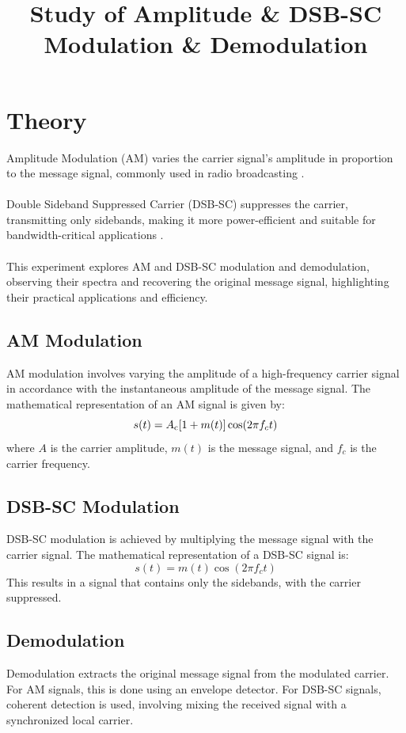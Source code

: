 \documentclass[12pt]{article}
\title{Study of Amplitude \& DSB-SC Modulation \& Demodulation}
\author{}
\date{}
\begin{document}


\pagebreak

\tableofcontents

\pagebreak
{}
\maketitle

\section*{Theory}
Amplitude Modulation (AM) varies the carrier signal's amplitude in proportion to the message signal, commonly used in radio broadcasting \cite{haykin2008communication}.
\\\\
Double Sideband Suppressed Carrier (DSB-SC) suppresses the carrier, transmitting only sidebands, making it more power-efficient and suitable for bandwidth-critical applications \cite{proakis2007digital}.
\\\\
This experiment explores AM and DSB-SC modulation and demodulation, observing their spectra and recovering the original message signal, highlighting their practical applications and efficiency.

\subsection*{AM Modulation}
AM modulation involves varying the amplitude of a high-frequency carrier signal in accordance with the instantaneous amplitude of the message signal. The mathematical representation of an AM signal is given by:
\[
    s(t) = A\textsubscript{c}[1 + m(t)] \cos(2 \pi f_c t)
\]
where \(A\) is the carrier amplitude, \(m(t)\) is the message signal, and \(f_c\) is the carrier frequency.

\subsection*{DSB-SC Modulation}
DSB-SC modulation is achieved by multiplying the message signal with the carrier signal. The mathematical representation of a DSB-SC signal is:
\[
    s(t) = m(t) \cos(2 \pi f_c t)
\]
This results in a signal that contains only the sidebands, with the carrier suppressed.

\subsection*{Demodulation}
Demodulation extracts the original message signal from the modulated carrier. For AM signals, this is done using an envelope detector. For DSB-SC signals, coherent detection is used, involving mixing the received signal with a synchronized local carrier.
\end{document}
